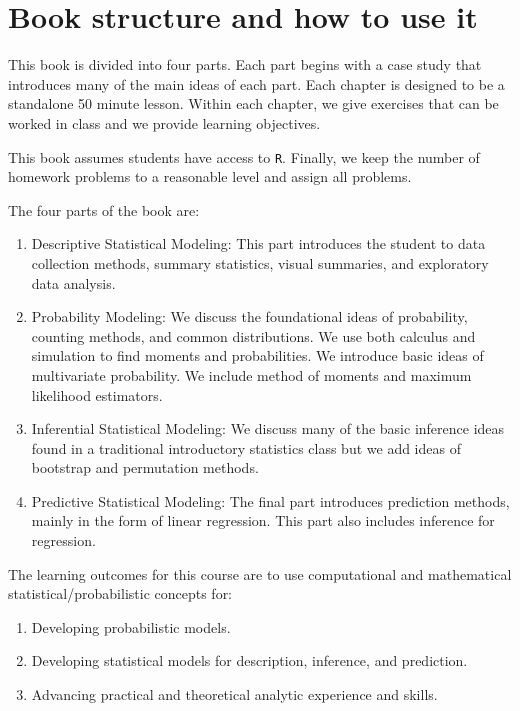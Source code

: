 \documentclass[
  letterpaper,
  DIV=11,
  numbers=noendperiod]{scrreprt}
\providecommand{\tightlist}{%
  \setlength{\itemsep}{0pt}\setlength{\parskip}{0pt}}\usepackage{longtable,booktabs,array}
\begin{document}
\section*{Book structure and how to use
it}\label{book-structure-and-how-to-use-it}


This book is divided into four parts. Each part begins with a case study
that introduces many of the main ideas of each part. Each chapter is
designed to be a standalone 50 minute lesson. Within each chapter, we
give exercises that can be worked in class and we provide learning
objectives.

This book assumes students have access to \texttt{R}. Finally, we keep
the number of homework problems to a reasonable level and assign all
problems.

The four parts of the book are:

\begin{enumerate}
\def\labelenumi{\arabic{enumi}.}
\item
  Descriptive Statistical Modeling: This part introduces the student to
  data collection methods, summary statistics, visual summaries, and
  exploratory data analysis.
\item
  Probability Modeling: We discuss the foundational ideas of
  probability, counting methods, and common distributions. We use both
  calculus and simulation to find moments and probabilities. We
  introduce basic ideas of multivariate probability. We include method
  of moments and maximum likelihood estimators.
\item
  Inferential Statistical Modeling: We discuss many of the basic
  inference ideas found in a traditional introductory statistics class
  but we add ideas of bootstrap and permutation methods.
\item
  Predictive Statistical Modeling: The final part introduces prediction
  methods, mainly in the form of linear regression. This part also
  includes inference for regression.
\end{enumerate}

The learning outcomes for this course are to use computational and
mathematical statistical/probabilistic concepts for:

\begin{enumerate}
\def\labelenumi{\alph{enumi}.}
\tightlist
\item
  Developing probabilistic models.\\
\item
  Developing statistical models for description, inference, and
  prediction.\\
\item
  Advancing practical and theoretical analytic experience and skills.
\end{enumerate}
\end{document}

